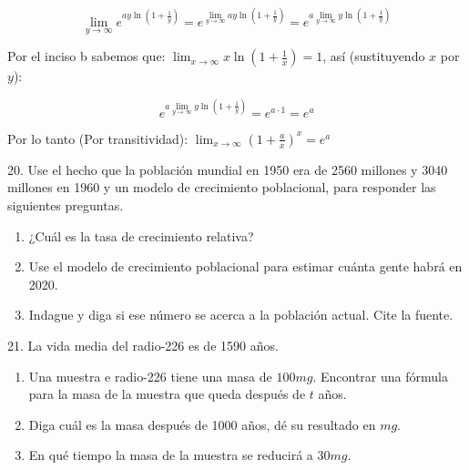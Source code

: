 \documentclass[12pt]{article}
\begin{document}
\begin{enumerate}[\hspace{9px} a)]
        \begin{equation*}
            \lim_{y \to \infty}e^{\displaystyle ay\ln\left(1+\frac{1}{y}\right)} = e^{\displaystyle\lim_{y \to \infty}ay\ln\left(1+\frac{1}{y}\right)} = e^{\displaystyle a\lim_{y \to \infty}y\ln\left(1+\frac{1}{y}\right)}
        \end{equation*}

        Por el inciso b sabemos que: \(\displaystyle\lim_{x \to \infty}x\ln\left(1+\frac{1}{x}\right)=1\), as\'i (sustituyendo $x$ por $y$):

        \begin{equation*}
            e^{a\displaystyle\lim_{y \to \infty}y\ln\left(1+\frac{1}{y}\right)} = e^{a\cdot1} = e^a
        \end{equation*}\medskip

        Por lo tanto (Por transitividad): \qquad
        \(\displaystyle\lim_{x \to \infty}\left(1+\frac{a}{x}\right)^x=e^a\)\bigskip

\end{enumerate}

20. Use el hecho que la poblaci\'on mundial en 1950 era de 2560 millones y 3040 millones en 1960 y un modelo de crecimiento poblacional, para responder las siguientes preguntas.

\begin{enumerate}[\hspace{9px} a)]
    \item ¿Cuál es la tasa de crecimiento relativa?

    \item Use el modelo de crecimiento poblacional para estimar cuánta gente habrá en 2020.

    \item Indague y diga si ese número se acerca a la población actual. Cite la fuente.

\end{enumerate}

21. La vida media del radio-226 es de 1590 años.

\begin{enumerate}[\hspace{9px} a)]
    \item Una muestra e radio-226 tiene una masa de $100mg$. Encontrar una fórmula para la masa de la muestra que queda después de $t$ años.

    \item Diga cuál es la masa después de 1000 años, dé su resultado en $mg$.

    \item En qué tiempo la masa de la muestra se reducirá a $30mg$.

\end{enumerate}
\end{document}
